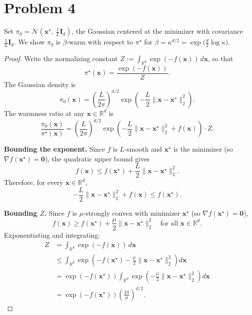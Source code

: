 \section*{Problem 4}

Set $\pi_0 = \mathcal{N}\!\left(\mathbf{x}^\star,\, \frac{1}{L}\mathbf{I}_d\right)$, the Gaussian centered at the minimizer with covariance $\frac{1}{L}\mathbf{I}_d$. We show $\pi_0$ is $\beta$-warm with respect to $\pi^\star$ for $\beta = \kappa^{d/2} = \exp\!\bigl(\tfrac{d}{2}\log\kappa\bigr)$.

\begin{proof}
Write the normalizing constant $Z := \int_{\mathbb{R}^d} \exp(-f(\mathbf{x}))\,d\mathbf{x}$, so that
\[
\pi^\star(\mathbf{x}) = \frac{\exp(-f(\mathbf{x}))}{Z}.
\]
The Gaussian density is
\[
\pi_0(\mathbf{x}) = \left(\frac{L}{2\pi}\right)^{d/2} \exp\!\left(-\frac{L}{2}\|\mathbf{x} - \mathbf{x}^\star\|_2^2\right).
\]
The warmness ratio at any $\mathbf{x} \in \mathbb{R}^d$ is
\[
\frac{\pi_0(\mathbf{x})}{\pi^\star(\mathbf{x})} = \left(\frac{L}{2\pi}\right)^{d/2} \exp\!\left(-\frac{L}{2}\|\mathbf{x} - \mathbf{x}^\star\|_2^2 + f(\mathbf{x})\right) \cdot Z.
\]

\textbf{Bounding the exponent.} Since $f$ is $L$-smooth and $\mathbf{x}^\star$ is the minimizer (so $\nabla f(\mathbf{x}^\star) = \mathbf{0}$), the quadratic upper bound gives
\[
f(\mathbf{x}) \leq f(\mathbf{x}^\star) + \frac{L}{2}\|\mathbf{x} - \mathbf{x}^\star\|_2^2.
\]
Therefore, for every $\mathbf{x} \in \mathbb{R}^d$,
\[
-\frac{L}{2}\|\mathbf{x} - \mathbf{x}^\star\|_2^2 + f(\mathbf{x}) \leq f(\mathbf{x}^\star).
\]

\textbf{Bounding $Z$.} Since $f$ is $\mu$-strongly convex with minimizer $\mathbf{x}^\star$ (so $\nabla f(\mathbf{x}^\star) = \mathbf{0}$),
\[
f(\mathbf{x}) \geq f(\mathbf{x}^\star) + \frac{\mu}{2}\|\mathbf{x} - \mathbf{x}^\star\|_2^2 \quad \text{for all } \mathbf{x} \in \mathbb{R}^d.
\]
Exponentiating and integrating:
\begin{align*}
Z &= \int_{\mathbb{R}^d} \exp(-f(\mathbf{x}))\,d\mathbf{x} \\
  &\leq \int_{\mathbb{R}^d} \exp\!\left(-f(\mathbf{x}^\star) - \frac{\mu}{2}\|\mathbf{x} - \mathbf{x}^\star\|_2^2\right)d\mathbf{x} \\
  &= \exp(-f(\mathbf{x}^\star)) \int_{\mathbb{R}^d} \exp\!\left(-\frac{\mu}{2}\|\mathbf{x} - \mathbf{x}^\star\|_2^2\right)d\mathbf{x} \\
  &= \exp(-f(\mathbf{x}^\star)) \left(\frac{2\pi}{\mu}\right)^{d/2}.
\end{align*}


\end{proof}
